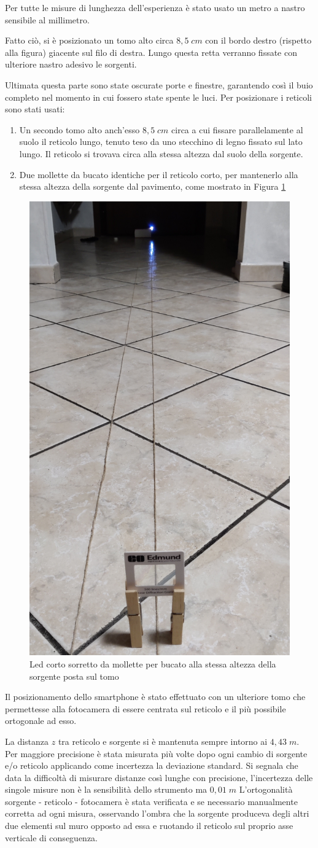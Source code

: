 \documentclass{article}
\begin{document}
\vspace{3mm}

Per tutte le misure di lunghezza dell'esperienza è stato usato un metro a nastro sensibile al millimetro.

\vspace{3mm}

Fatto ciò, si è posizionato un tomo alto circa $8,5 \; cm$ con il bordo destro (rispetto alla figura) giacente sul filo di destra. Lungo questa retta verranno fissate con ulteriore nastro adesivo le sorgenti. 

\vspace{3mm}

Ultimata questa parte sono state oscurate porte e finestre, garantendo così il buio completo nel momento in cui fossero state spente le luci. Per posizionare i reticoli sono stati usati:
\begin{enumerate}
    \item Un secondo tomo alto anch'esso $8,5 \; cm$ circa a cui fissare parallelamente al suolo il reticolo lungo, tenuto teso da uno stecchino di legno fissato sul lato lungo. Il reticolo si trovava circa alla stessa altezza dal suolo della sorgente.
    \item Due mollette da bucato identiche per il reticolo corto, per mantenerlo alla stessa altezza della sorgente dal pavimento, come mostrato in Figura \ref{impalcatura}
\end{enumerate}

\begin{figure}[h]
    \centering
    \includegraphics[width=0.2\linewidth]{LedCorto2_Impalcatura.jpg}
    \caption{Led corto sorretto da mollette per bucato alla stessa altezza della sorgente posta sul tomo}
    \label{impalcatura}
\end{figure}

Il posizionamento dello smartphone è stato effettuato con un ulteriore tomo che permettesse alla fotocamera di essere centrata sul reticolo e il più possibile ortogonale ad esso.

La distanza $z$ tra reticolo e sorgente si è mantenuta sempre intorno ai $4,43 \; m$. Per maggiore precisione è stata misurata più volte dopo ogni cambio di sorgente e/o reticolo applicando come incertezza la deviazione standard. Si segnala che data la difficoltà di misurare distanze così lunghe con precisione, l'incertezza delle singole misure non è la sensibilità dello strumento ma $0,01 \; m$
L'ortogonalità sorgente - reticolo - fotocamera è stata verificata e se necessario manualmente corretta ad ogni misura, osservando l'ombra che la sorgente produceva degli altri due elementi sul muro opposto ad essa e ruotando il reticolo sul proprio asse verticale di conseguenza.
\end{document}
